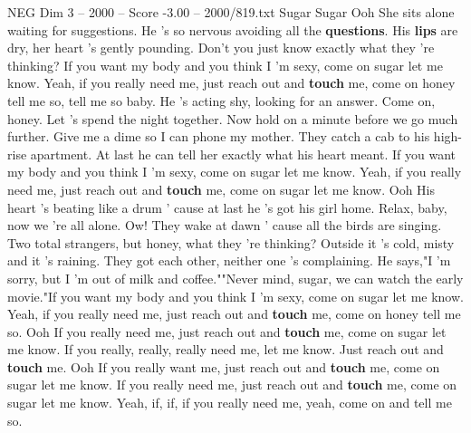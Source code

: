 \begin{textsample}{NEG Dim 3 – 2000 – Score -3.00 – 2000/819.txt}  \label{ex:f3_neg_004}
Sugar Sugar Ooh She sits alone waiting for suggestions.
He 's so nervous avoiding all the \textbf{questions}.
His \textbf{lips} are dry, her heart 's gently pounding.
Don't you just know exactly what they 're thinking?
If you want my body and you think I 'm sexy, come on sugar let me know.
Yeah, if you really need me, just reach out and \textbf{touch} me, come on honey tell me so, tell me so baby.
He 's acting shy, looking for an answer.
Come on, honey.
Let 's spend the night together.
Now hold on a minute before we go much further.
Give me a dime so I can phone my mother.
They catch a cab to his high-rise apartment.
At last he can tell her exactly what his heart meant.
If you want my body and you think I 'm sexy, come on sugar let me know.
Yeah, if you really need me, just reach out and \textbf{touch} me, come on sugar let me know.
Ooh His heart 's beating like a drum ' cause at last he 's got his girl home.
Relax, baby, now we 're all alone.
Ow!
They wake at dawn ' cause all the birds are singing.
Two total strangers, but honey, what they 're thinking?
Outside it 's cold, misty and it 's raining.
They got each other, neither one 's complaining.
He says,"I 'm sorry, but I 'm out of milk and coffee.""Never mind, sugar, we can watch the early movie."If you want my body and you think I 'm sexy, come on sugar let me know.
Yeah, if you really need me, just reach out and \textbf{touch} me, come on honey tell me so.
Ooh If you really need me, just reach out and \textbf{touch} me, come on sugar let me know.
If you really, really, really need me, let me know.
Just reach out and \textbf{touch} me.
Ooh If you really want me, just reach out and \textbf{touch} me, come on sugar let me know.
If you really need me, just reach out and \textbf{touch} me, come on sugar let me know.
Yeah, if, if, if you really need me, yeah, come on and tell me so.

\end{textsample}
